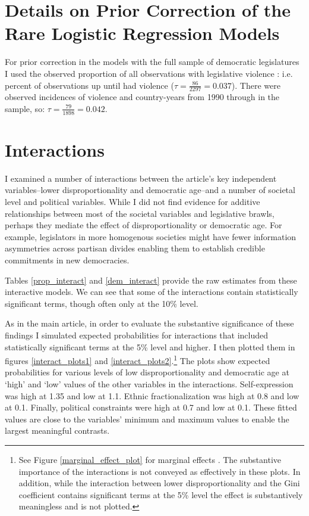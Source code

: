 \documentclass[a4paper]{article}\usepackage[]{graphicx}\usepackage[]{color}
\begin{document}
\section*{Details on Prior Correction of the Rare Logistic Regression Models}

For prior correction \citep[see][]{KingRareEventsPA2001} in the models with the full sample of democratic legislatures I used the observed proportion of all observations with legislative violence : i.e.  percent of observations up until  had violence ($\tau = \frac{86}{2297} = 0.037$). There were  observed incidences of violence and  country-years from 1990 through  in the sample, so: $\tau = \frac{79}{1898} = 0.042$.

\section*{Interactions}


I examined a number of interactions between the article's key independent variables--lower disproportionality and democratic age--and a number of societal level and political variables. While I did not find evidence for additive relationships between most of the societal variables and legislative brawls, perhaps they mediate the effect of disproportionality or democratic age. For example, legislators in more homogenous societies might have fewer information asymmetries across partisan divides enabling them to establish credible commitments in new democracies.

Tables \ref{prop_interact} and \ref{dem_interact} provide the raw estimates from these interactive models. We can see that some of the interactions contain statistically significant terms, though often only at the 10\% level.

As in the main article, in order to evaluate the substantive significance of these findings I simulated expected probabilities for interactions that included statistically significant terms at the 5\% level and higher. I then plotted them in figures \ref{interact_plots1} and \ref{interact_plots2}.\footnote{See Figure \ref{marginal_effect_plot} for marginal effects \citep{Brambor2006}. The substantive importance of the interactions is not conveyed as effectively in these plots. In addition, while the interaction between lower disproportionality and the Gini coefficient contains significant terms at the 5\% level the effect is substantively meaningless and is not plotted.} The plots show expected probabilities for various levels of low disproportionality and democratic age at `high' and `low' values of the other variables in the interactions. Self-expression was high at 1.35 and low at 1.1. Ethnic fractionalization was high at 0.8 and low at 0.1. Finally, political constraints were high at 0.7 and low at 0.1. These fitted values are close to the variables' minimum and maximum values to enable the largest meaningful contrasts.
\end{document}
